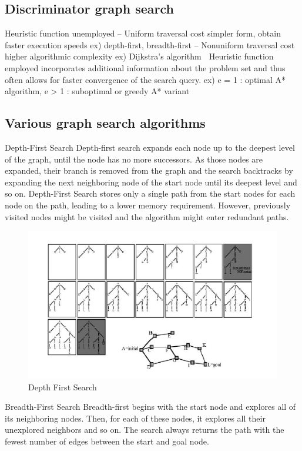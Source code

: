 \documentclass[twoside]{article}
\begin{document}
\subsection{Discriminator graph search}
Heuristic function unemployed
– Uniform traversal cost simpler form, obtain faster execution speeds 
ex) depth-first, breadth-first
– Nonuniform traversal cost higher algorithmic complexity
ex) Dijkstra’s algorithm
 Heuristic function employed incorporates additional information about the problem set and thus often allows for faster convergence of the search query.
ex) e = 1 : optimal A* algorithm, e > 1 : suboptimal or greedy A* variant

\subsection{Various graph search algorithms}
Depth-First Search
Depth-first search expands each node up to the deepest level of the graph, until the node has no more successors. As those nodes are expanded, their branch is removed from the graph and the search backtracks by expanding the next neighboring node of the start node until its deepest level and so on.
Depth-First Search stores only a single path from the start nodes for each node on the path, leading to a lower memory requirement. However, previously visited nodes might be visited and the algorithm might enter redundant paths.

\begin{figure}[h]
\begin{center}
\includegraphics{fig15_8.PNG}
\caption{Depth First Search}
\end{center}
\end{figure}

Breadth-First Search
Breadth-first begins with the start node and explores all of its neighboring nodes. Then, for each of these nodes, it explores all their unexplored neighbors and so on.
The search always returns the path with the fewest number of edges between the start and goal node.
\end{document}

